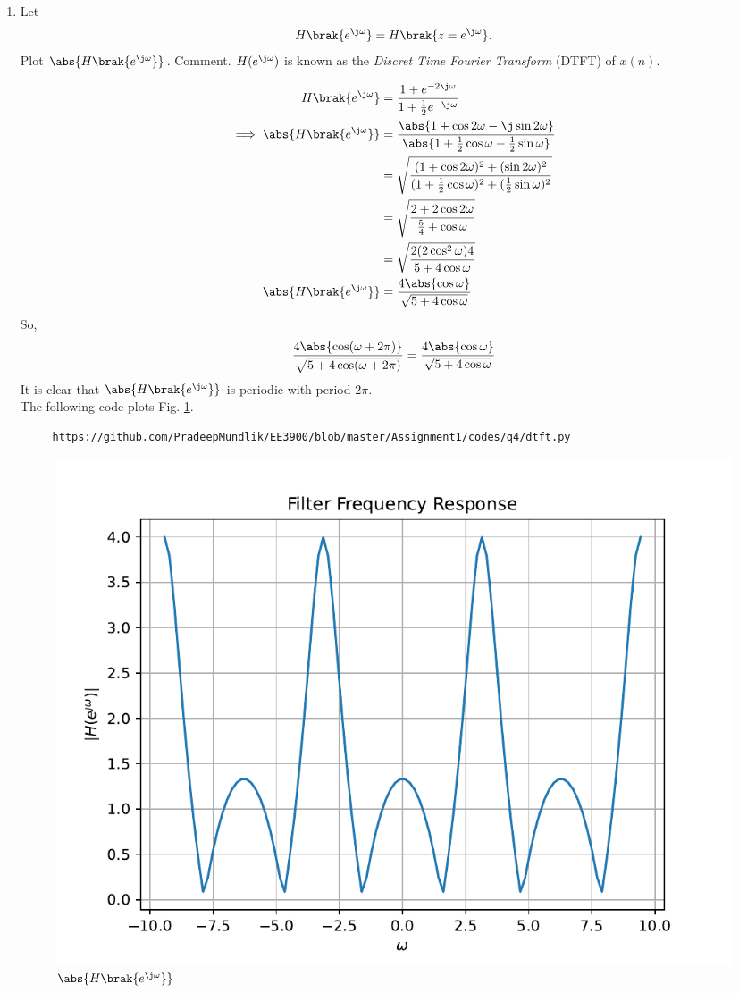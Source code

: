 \documentclass[journal,12pt,twocolumn]{IEEEtran}
\renewcommand\thesection{\arabic{section}}
\begin{document}
\begin{enumerate}[label=\thesection.\arabic*]
%
\item 
Let
\begin{equation}
H\brak{e^{\j \omega}} = H\brak{z = e^{\j \omega}}.
\end{equation}
Plot $\abs{H\brak{e^{\j \omega}}}$.  Comment.  $H(e^{\j \omega})$ is
known as the {\em Discret Time Fourier Transform} (DTFT) of $x(n)$.
\\
\solution 

\begin{align}
     H\brak{e^{\j \omega}} &= \frac{1 + e^{-2\j\omega}}{1 + \frac12 e^{-\j\omega}} \\
     \implies \abs{H\brak{e^{\j \omega}}} &= \frac{\abs{1 + \cos2\omega - \j\sin2\omega}}{\abs{1 + \frac12 \cos\omega - \frac12 \sin\omega}} \\
     &= \sqrt{\frac{(1 + \cos2\omega)^2 + (\sin2\omega)^2}{(1 + \frac12 \cos\omega)^2 + (\frac12 \sin\omega)^2}} \\
     &= \sqrt{\frac{2 + 2\cos2\omega}{\frac54 + \cos\omega}} \\
     &= \sqrt{\frac{2(2\cos^2\omega)4}{5 + 4\cos\omega} } \\
     \abs{H\brak{e^{\j \omega}}}&= \frac{4\abs{\cos\omega}}{\sqrt{5 + 4\cos\omega}} 
\end{align}
So,
\begin{equation}
     \frac{4\abs{\cos(\omega+2\pi)}}{\sqrt{5 + 4\cos(\omega+2\pi)}} = \frac{4\abs{\cos\omega}}{\sqrt{5 + 4\cos\omega}}
\end{equation}
It is clear that $\abs{H\brak{e^{\j \omega}}}$ is periodic with period $2\pi$. \\
The following code plots Fig. \ref{fig:dtft}.
\begin{lstlisting}
     https://github.com/PradeepMundlik/EE3900/blob/master/Assignment1/codes/q4/dtft.py
\end{lstlisting}
\begin{figure}[!ht]
\centering
\includegraphics[width=\columnwidth]{figs/q4/dtft.pdf}
\caption{$\abs{H\brak{e^{\j\omega}}}$}
\label{fig:dtft}
\end{figure}


\end{enumerate}
\end{document}
